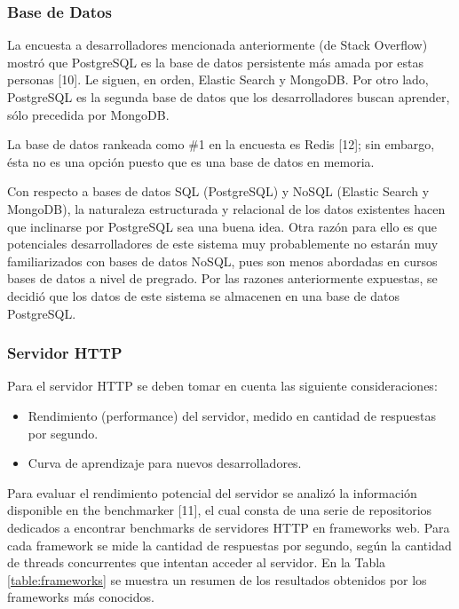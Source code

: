 \subsubsection{Base de Datos}

La encuesta a desarrolladores mencionada anteriormente (de Stack Overflow)
mostró que PostgreSQL es la base de datos persistente más amada por estas
personas [10]. Le siguen, en orden, Elastic Search y MongoDB. Por otro lado,
PostgreSQL es la segunda base de datos que los desarrolladores buscan aprender,
sólo precedida por MongoDB.

La base de datos rankeada como \#1 en la encuesta es Redis [12]; sin embargo,
ésta no es una opción puesto que es una base de datos en memoria.

Con respecto a bases de datos SQL (PostgreSQL) y NoSQL (Elastic Search y
MongoDB), la naturaleza estructurada y relacional de los datos existentes hacen
que inclinarse por PostgreSQL sea una buena idea. Otra razón para ello es que
potenciales desarrolladores de este sistema muy probablemente no estarán muy
familiarizados con bases de datos NoSQL, pues son menos abordadas en cursos
bases de datos a nivel de pregrado. Por las razones anteriormente expuestas, se
decidió que los datos de este sistema se almacenen en una base de datos
PostgreSQL.

\subsubsection{Servidor HTTP}

Para el servidor HTTP se deben tomar en cuenta las siguiente consideraciones:

\begin{itemize}
\item Rendimiento (performance) del servidor, medido en cantidad de respuestas
por segundo.
\item Curva de aprendizaje para nuevos desarrolladores.
\end{itemize}

Para evaluar el rendimiento potencial del servidor se analizó la información
disponible en the benchmarker [11], el cual consta de una serie de repositorios
dedicados a encontrar benchmarks de servidores HTTP en frameworks web. Para cada
framework se mide la cantidad de respuestas por segundo, según la cantidad de
threads concurrentes que intentan acceder al servidor. En la Tabla
\ref{table:frameworks} se muestra un resumen de los resultados obtenidos por los
frameworks más conocidos.


